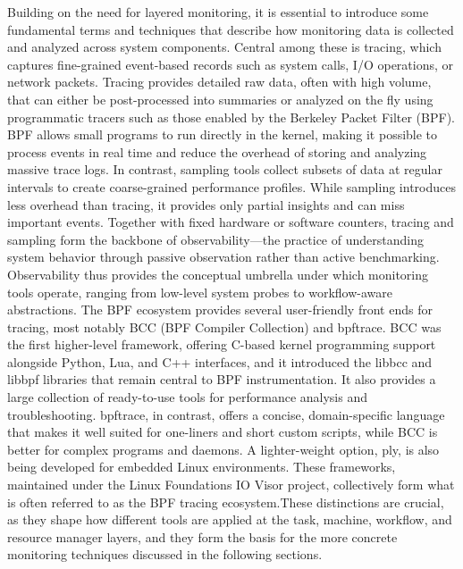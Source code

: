 Building on the need for layered monitoring, it is essential to introduce some fundamental terms and techniques that describe how monitoring data is collected and analyzed across system components. Central among these is tracing, which captures fine-grained event-based records such as system calls, I/O operations, or network packets. Tracing provides detailed raw data, often with high volume, that can either be post-processed into summaries or analyzed on the fly using programmatic tracers such as those enabled by the Berkeley Packet Filter (BPF). BPF allows small programs to run directly in the kernel, making it possible to process events in real time and reduce the overhead of storing and analyzing massive trace logs. In contrast, sampling tools collect subsets of data at regular intervals to create coarse-grained performance profiles. While sampling introduces less overhead than tracing, it provides only partial insights and can miss important events. Together with fixed hardware or software counters, tracing and sampling form the backbone of observability—the practice of understanding system behavior through passive observation rather than active benchmarking. Observability thus provides the conceptual umbrella under which monitoring tools operate, ranging from low-level system probes to workflow-aware abstractions.
The BPF ecosystem provides several user-friendly front ends for tracing, most notably BCC (BPF Compiler Collection) and bpftrace. BCC was the first higher-level framework, offering C-based kernel programming support alongside Python, Lua, and C++ interfaces, and it introduced the libbcc and libbpf libraries that remain central to BPF instrumentation. It also provides a large collection of ready-to-use tools for performance analysis and troubleshooting. bpftrace, in contrast, offers a concise, domain-specific language that makes it well suited for one-liners and short custom scripts, while BCC is better for complex programs and daemons. A lighter-weight option, ply, is also being developed for embedded Linux environments. These frameworks, maintained under the Linux Foundations IO Visor project, collectively form what is often referred to as the BPF tracing ecosystem.These distinctions are crucial, as they shape how different tools are applied at the task, machine, workflow, and resource manager layers, and they form the basis for the more concrete monitoring techniques discussed in the following sections.


